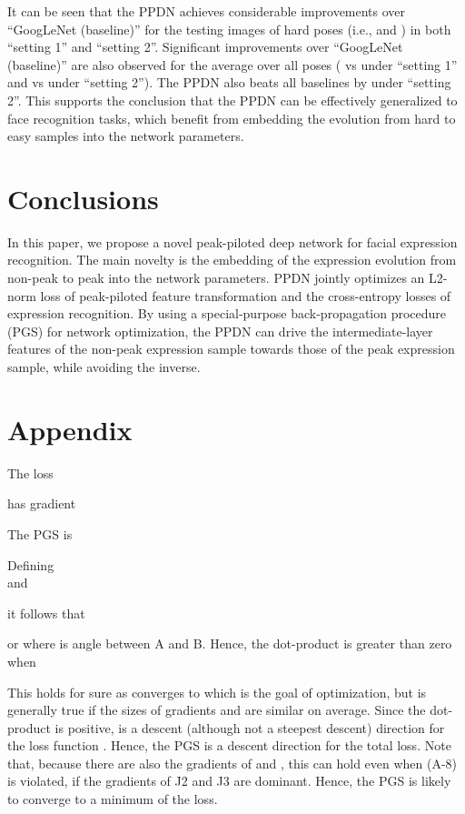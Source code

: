 \documentclass[runningheads]{llncs}
\begin{document}
It can be seen that the PPDN achieves considerable improvements over 
``GoogLeNet (baseline)'' for the testing images of hard poses 
(i.e.,  and ) in both ``setting 1'' and ``setting 2''. 
Significant improvements over ``GoogLeNet (baseline)'' are also observed
for the average over all poses ( vs  under ``setting 1'' 
and  vs  under ``setting 2''). 
The PPDN also beats all baselines by  under ``setting 2''. 
This supports the conclusion that the PPDN can be effectively generalized to 
face recognition tasks, which benefit from embedding the evolution from 
hard to easy samples into the network parameters. 






\section{Conclusions}

In this paper, we propose a novel peak-piloted deep network for facial 
expression recognition. The main novelty is the embedding of the
expression evolution from non-peak to peak into the network parameters.
PPDN jointly optimizes an L2-norm loss of peak-piloted feature 
transformation and the cross-entropy losses of expression recognition. 
By using a special-purpose back-propagation procedure (PGS) for network 
optimization, the PPDN can  drive the intermediate-layer features of the 
non-peak expression sample towards those of the peak expression sample, 
while avoiding the inverse.\\  

\renewcommand{\theequation}{A-\arabic{equation}}
\setcounter{equation}{0}  \section*{Appendix}  The loss 
  
 has gradient 
 
 The PGS is 
 
  Defining
  \\
  and
  
  it follows that
  
 or 
  where  is angle between A and B. 
  Hence, the dot-product is greater than zero when
  
  This holds for sure as  converges to 
   which is the goal of optimization, but is 
  generally true if the sizes of gradients  and 
   are similar on average. Since the dot-product is positive,   is a descent (although not a steepest descent) direction for the loss function . Hence, the PGS is a descent direction for the total loss. Note that, because there are also the gradients of  and , this can hold even when (A-8) is violated, if the gradients of J2 and J3 are dominant. Hence, the PGS is likely to converge to a minimum of the loss. 
\clearpage


\clearpage
\end{document}
